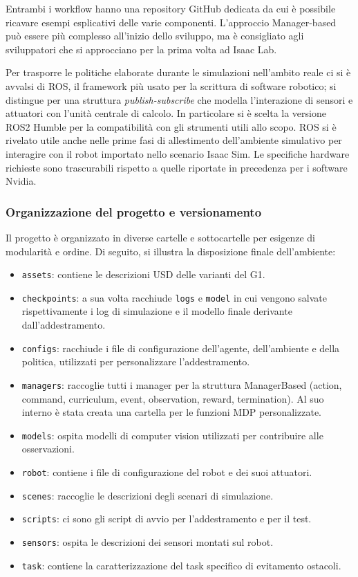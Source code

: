 Entrambi i workflow hanno una repository GitHub dedicata da cui è possibile ricavare esempi esplicativi delle varie componenti. L'approccio Manager-based può essere più complesso all'inizio dello sviluppo, ma è consigliato agli sviluppatori che si approcciano per la prima volta ad Isaac Lab.

Per trasporre le politiche elaborate durante le simulazioni nell'ambito reale ci si è avvalsi di ROS, il framework più usato per la scrittura di software robotico; si distingue per una struttura \textit{publish-subscribe} che modella l'interazione di sensori e attuatori con l'unità centrale di calcolo. In particolare si è scelta la versione ROS2 Humble per la compatibilità con gli strumenti utili allo scopo. ROS si è rivelato utile anche nelle prime fasi di allestimento dell'ambiente simulativo per interagire con il robot importato nello scenario Isaac Sim. Le specifiche hardware richieste sono trascurabili rispetto a quelle riportate in precedenza per i software Nvidia.

\subsubsection{Organizzazione del progetto e versionamento}

Il progetto è organizzato in diverse cartelle e sottocartelle per esigenze di modularità e ordine. Di seguito, si illustra la disposizione finale dell'ambiente:

\begin{itemize}
    \item \texttt{assets}: contiene le descrizioni USD delle varianti del G1.
    \item \texttt{checkpoints}: a sua volta racchiude \texttt{logs} e \texttt{model} in cui vengono salvate rispettivamente i log di simulazione e il modello finale derivante dall'addestramento.
    \item \texttt{configs}: racchiude i file di configurazione dell'agente, dell'ambiente e della politica, utilizzati per personalizzare l'addestramento.
    \item \texttt{managers}: raccoglie tutti i manager per la struttura ManagerBased (action, command, curriculum, event, observation, reward, termination). Al suo interno è stata creata una cartella per le funzioni MDP personalizzate.
    \item \texttt{models}: ospita modelli di computer vision utilizzati per contribuire alle osservazioni.
    \item \texttt{robot}: contiene i file di configurazione del robot e dei suoi attuatori.
    \item \texttt{scenes}: raccoglie le descrizioni degli scenari di simulazione.
    \item \texttt{scripts}: ci sono gli script di avvio per l'addestramento e per il test.
    \item \texttt{sensors}: ospita le descrizioni dei sensori montati sul robot.
    \item \texttt{task}: contiene la caratterizzazione del task specifico di evitamento ostacoli.
\end{itemize}

